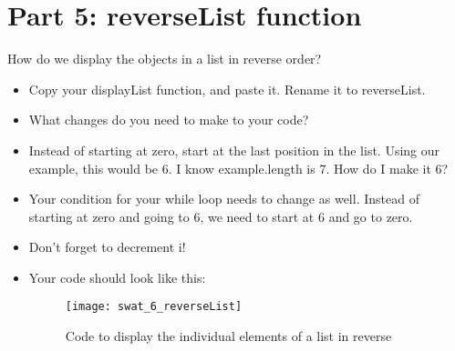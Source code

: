 \documentclass{article}
\begin{document}
\section*{Part 5: reverseList function}
How do we display the objects in a list in reverse order?
\begin{itemize}
    \item Copy your displayList function, and paste it.  Rename it to reverseList.
    \item What changes do you need to make to your code?
    \item Instead of starting at zero, start at the last position in the list.  Using our example, this would be 6.  I know example.length is 7.  How do I make it 6?
    \item Your condition for your while loop needs to change as well.  Instead of starting at zero and going to 6, we need to start at 6 and go to zero.
    \item Don't forget to decrement i!
    \item Your code should look like this:
    	\begin{figure}[H]
  		\centering
  		\texttt{[image: swat\_6\_reverseList]}
  		\caption{Code to display the individual elements of a list in reverse}
	\end{figure}
\end{itemize}
\end{document}
